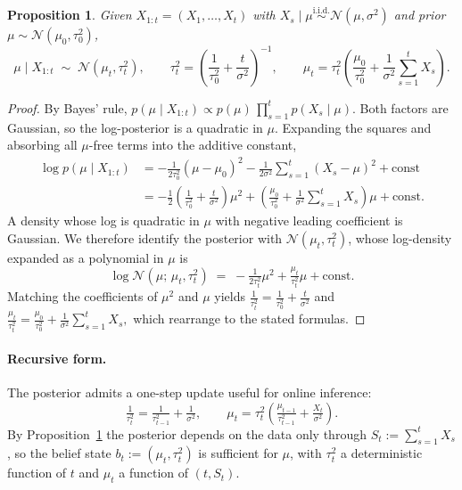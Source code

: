 \documentclass[11pt]{article}
\newtheorem{proposition}{Proposition}
\begin{document}
\begin{proposition}
\label{prop:posterior}
Given $X_{1:t} = (X_1,\ldots,X_t)$ with $X_s \mid \mu \overset{\text{i.i.d.}}{\sim} \mathcal{N}(\mu, \sigma^2)$ and prior $\mu \sim \mathcal{N}(\mu_0, \tau_0^2)$,
\[
\mu \mid X_{1:t} \;\sim\; \mathcal{N}(\mu_t, \tau_t^2),
\qquad
\tau_t^2 = \left(\frac{1}{\tau_0^2} + \frac{t}{\sigma^2}\right)^{-1},
\qquad
\mu_t = \tau_t^2 \left(\frac{\mu_0}{\tau_0^2} + \frac{1}{\sigma^2}\sum_{s=1}^t X_s\right).
\]
\end{proposition}

\begin{proof}
By Bayes' rule, $p(\mu \mid X_{1:t}) \propto p(\mu)\, \prod_{s=1}^t p(X_s \mid \mu)$. Both factors are Gaussian, so the log-posterior is a quadratic in $\mu$. Expanding the squares and absorbing all $\mu$-free terms into the additive constant,
\begin{align*}
\log p(\mu \mid X_{1:t})
&= -\tfrac{1}{2\tau_0^2}(\mu-\mu_0)^2 - \tfrac{1}{2\sigma^2}\sum_{s=1}^t (X_s-\mu)^2 + \text{const} \\
&= -\tfrac{1}{2}\!\left(\tfrac{1}{\tau_0^2} + \tfrac{t}{\sigma^2}\right)\mu^2 + \left(\tfrac{\mu_0}{\tau_0^2} + \tfrac{1}{\sigma^2}\sum_{s=1}^t X_s\right)\mu + \text{const}.
\end{align*}
A density whose log is quadratic in $\mu$ with negative leading coefficient is Gaussian. We therefore identify the posterior with $\mathcal{N}(\mu_t, \tau_t^2)$, whose log-density expanded as a polynomial in $\mu$ is
\[
\log \mathcal{N}(\mu;\, \mu_t, \tau_t^2) \;=\; -\tfrac{1}{2\tau_t^2}\mu^2 + \tfrac{\mu_t}{\tau_t^2}\mu + \text{const}.
\]
Matching the coefficients of $\mu^2$ and $\mu$ yields
\(
\tfrac{1}{\tau_t^2} = \tfrac{1}{\tau_0^2} + \tfrac{t}{\sigma^2}
\)
and
\(
\tfrac{\mu_t}{\tau_t^2} = \tfrac{\mu_0}{\tau_0^2} + \tfrac{1}{\sigma^2}\sum_{s=1}^t X_s,
\)
which rearrange to the stated formulas.
\end{proof}

\paragraph{Recursive form.} The posterior admits a one-step update useful for online inference:
\[
\tfrac{1}{\tau_t^2} = \tfrac{1}{\tau_{t-1}^2} + \tfrac{1}{\sigma^2},
\qquad
\mu_t = \tau_t^2\!\left(\tfrac{\mu_{t-1}}{\tau_{t-1}^2} + \tfrac{X_t}{\sigma^2}\right).
\]
By Proposition~\ref{prop:posterior} the posterior depends on the data only through $S_t := \sum_{s=1}^t X_s$, so the belief state $b_t := (\mu_t, \tau_t^2)$ is sufficient for $\mu$, with $\tau_t^2$ a deterministic function of $t$ and $\mu_t$ a function of $(t, S_t)$.
\end{document}
